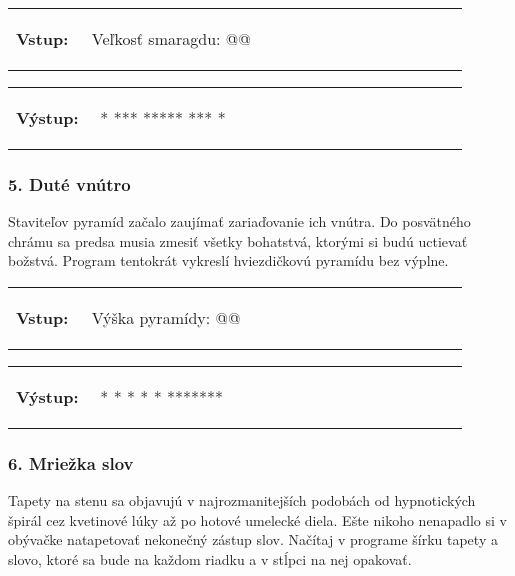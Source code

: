 \begin{tabular}{@{}p{0.15\linewidth}p{0.75\linewidth}}
\textbf{\small Vstup:} &
\vspace{-3em}
\begin{code}
Veľkosť smaragdu: @\fbox{5}@
\end{code}
\end{tabular}

\vspace{-2em}
\begin{tabular}{@{}p{0.15\linewidth}p{0.75\linewidth}}
\textbf{\small Výstup:} &
\vspace{-3em}
\begin{code}
 *
***
*****
***
 *
\end{code}
\end{tabular}
\vspace{-2em}

\subsubsection*{5. Duté vnútro}
Staviteľov pyramíd začalo zaujímať zariaďovanie ich vnútra. Do posvätného chrámu sa predsa musia zmesiť všetky bohatstvá, ktorými si budú uctievať božstvá. Program tentokrát vykreslí hviezdičkovú pyramídu bez výplne.

\begin{tabular}{@{}p{0.15\linewidth}p{0.75\linewidth}}
\textbf{\small Vstup:} &
\vspace{-3em}
\begin{code}
Výška pyramídy: @\fbox{4}@
\end{code}
\end{tabular}

\vspace{-2em}
\begin{tabular}{@{}p{0.15\linewidth}p{0.75\linewidth}}
\textbf{\small Výstup:} &
\vspace{-3em}
\begin{code}
   *
  * *
 *   *
*******
\end{code}
\end{tabular}
\vspace{-2em}


\subsubsection*{6. Mriežka slov}
Tapety na stenu sa objavujú v najrozmanitejších podobách od hypnotických špirál cez kvetinové lúky až po hotové umelecké diela. Ešte nikoho nenapadlo si v obývačke natapetovať nekonečný zástup slov. Načítaj v programe šírku tapety a slovo, ktoré sa bude na každom riadku a v stĺpci na nej opakovať.

